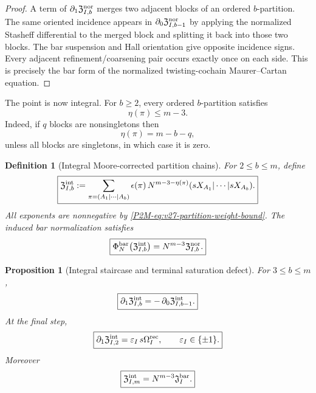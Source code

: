 \documentclass[11pt]{article}
\newtheorem{proposition}[theorem]{Proposition}
\newtheorem{definition}[theorem]{Definition}
\theoremstyle{remark}
\begin{document}
\begin{proof}
A term of \(\partial_1\mathfrak Z^{\rm nor}_{I,b}\) merges two adjacent
blocks of an ordered \(b\)-partition.  The same oriented incidence appears in
\(\partial_0\mathfrak Z^{\rm nor}_{I,b-1}\) by applying the normalized
Stasheff differential to the merged block and splitting it back into those
two blocks.  The bar suspension and Hall orientation give opposite incidence
signs.  Every adjacent refinement/coarsening pair occurs exactly once on each
side.  This is precisely the bar form of the normalized twisting-cochain
Maurer--Cartan equation.
\end{proof}

The point is now integral.  For \(b\ge2\), every ordered \(b\)-partition
satisfies
\begin{equation}\label{P2M-eq:v27-partition-weight-bound}
 \boxed{
 \eta(\pi)\le m-3.}
\end{equation}
Indeed, if \(q\) blocks are nonsingletons then
\[
 \eta(\pi)=m-b-q,
\]
unless all blocks are singletons, in which case it is zero.

\begin{definition}[Integral Moore-corrected partition chains]
\label{P2M-def:v27-integral-partition-chains}
For \(2\le b\le m\), define
\begin{equation}\label{P2M-eq:v27-integral-partition-chain}
 \boxed{
 \mathfrak Z^{\rm int}_{I,b}
 :=
 \sum_{\pi=(A_1|\cdots|A_b)}
 \epsilon(\pi)\,
 N^{m-3-\eta(\pi)}
 (sX_{A_1}|\cdots|sX_{A_b}).}
\end{equation}
All exponents are nonnegative by
\eqref{P2M-eq:v27-partition-weight-bound}.  The induced bar normalization satisfies
\begin{equation}
 \boxed{
 \Phi_N^{\rm bar}
 \bigl(\mathfrak Z^{\rm int}_{I,b}\bigr)
 =
 N^{m-3}\mathfrak Z^{\rm nor}_{I,b}.}
\end{equation}
\end{definition}

\begin{proposition}[Integral staircase and terminal saturation defect]
\label{P2M-prop:v27-integral-staircase}
For \(3\le b\le m\),
\begin{equation}
 \boxed{
 \partial_1\mathfrak Z^{\rm int}_{I,b}
 =
 -\,\partial_0\mathfrak Z^{\rm int}_{I,b-1}.}
\end{equation}
At the final step,
\begin{equation}\label{P2M-eq:v27-integral-terminal-step}
 \boxed{
 \partial_1\mathfrak Z^{\rm int}_{I,2}
 =
 \varepsilon_I\,s\Omega_I^{\rm rec},
 \qquad
 \varepsilon_I\in\{\pm1\}.}
\end{equation}
Moreover
\begin{equation}\label{P2M-eq:v27-top-singleton-prefactor}
 \boxed{
 \mathfrak Z^{\rm int}_{I,m}
 =
 N^{m-3}\mathfrak J_I^{\rm bar}.}
\end{equation}
\end{proposition}
\end{document}
